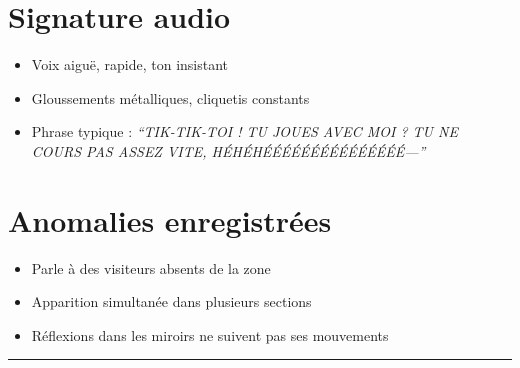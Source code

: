 \section*{Signature audio}
\begin{itemize}[noitemsep]
  \item Voix aiguë, rapide, ton insistant
  \item Gloussements métalliques, cliquetis constants
  \item Phrase typique : \textit{“TIK-TIK-TOI ! TU JOUES AVEC MOI ? TU NE COURS PAS ASSEZ VITE, HÉHÉHÉÉÉÉÉÉÉÉÉÉÉÉÉÉÉ—”}
\end{itemize}

\section*{Anomalies enregistrées}
\begin{itemize}[noitemsep]
  \item Parle à des visiteurs absents de la zone
  \item Apparition simultanée dans plusieurs sections
  \item Réflexions dans les miroirs ne suivent pas ses mouvements
\end{itemize}

\vfill
\hrule
